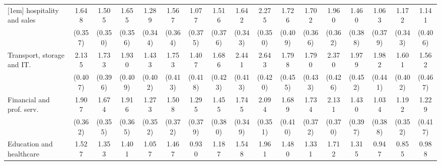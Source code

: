 {\begin{tabular}{l*{16}{c}}
[1em]
hospitality and sales&       1.648\sym{***}&       1.505\sym{***}&       1.655\sym{***}&       1.289\sym{***}&       1.567\sym{***}&       1.077\sym{**} &       1.516\sym{***}&       1.642\sym{***}&       2.275\sym{***}&       1.726\sym{***}&       1.702\sym{***}&       1.960\sym{***}&       1.460\sym{***}&       1.063\sym{**} &       1.172\sym{***}&       1.141\sym{**} \\
                    &     (0.357)         &     (0.350)         &     (0.356)         &     (0.344)         &     (0.364)         &     (0.375)         &     (0.376)         &     (0.343)         &     (0.350)         &     (0.409)         &     (0.366)         &     (0.362)         &     (0.388)         &     (0.379)         &     (0.343)         &     (0.406)         \\
[1em]
Transport, storage and IT.&       2.135\sym{***}&       1.733\sym{***}&       1.930\sym{***}&       1.433\sym{***}&       1.753\sym{***}&       1.407\sym{***}&       1.686\sym{***}&       2.441\sym{***}&       2.643\sym{***}&       1.798\sym{***}&       1.790\sym{***}&       2.370\sym{***}&       1.979\sym{***}&       1.982\sym{***}&       1.601\sym{***}&       1.562\sym{***}\\
                    &     (0.407)         &     (0.396)         &     (0.409)         &     (0.402)         &     (0.413)         &     (0.418)         &     (0.423)         &     (0.413)         &     (0.420)         &     (0.455)         &     (0.433)         &     (0.426)         &     (0.452)         &     (0.441)         &     (0.402)         &     (0.467)         \\
[1em]
Financial and prof. serv.&       1.907\sym{***}&       1.674\sym{***}&       1.916\sym{***}&       1.273\sym{***}&       1.508\sym{***}&       1.295\sym{***}&       1.455\sym{***}&       1.745\sym{***}&       2.094\sym{***}&       1.689\sym{***}&       1.734\sym{***}&       2.131\sym{***}&       1.430\sym{***}&       1.034\sym{**} &       1.192\sym{***}&       1.229\sym{**} \\
                    &     (0.362)         &     (0.355)         &     (0.365)         &     (0.352)         &     (0.372)         &     (0.379)         &     (0.380)         &     (0.349)         &     (0.351)         &     (0.410)         &     (0.372)         &     (0.370)         &     (0.397)         &     (0.388)         &     (0.352)         &     (0.417)         \\
[1em]
Education and healthcare&       1.527\sym{***}&       1.353\sym{***}&       1.401\sym{***}&       1.057\sym{**} &       1.467\sym{***}&       0.930\sym{*}  &       1.187\sym{**} &       1.548\sym{***}&       1.961\sym{***}&       1.480\sym{***}&       1.331\sym{***}&       1.712\sym{***}&       1.315\sym{**} &       0.947\sym{*}  &       0.855\sym{*}  &       0.988\sym{*}  \\

\end{tabular}}
